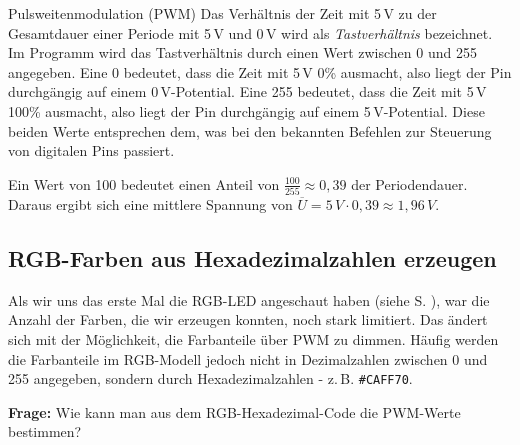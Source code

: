 \begin{zsfg}{Pulsweitenmodulation (PWM)}
	Das Verhältnis der Zeit mit 5\,V zu der Gesamtdauer einer Periode mit 5\,V und 0\,V wird als \emph{Tastverhältnis} bezeichnet. Im Programm wird das Tastverhältnis durch einen Wert zwischen 0 und 255 angegeben. Eine 0 bedeutet, dass die Zeit mit 5\,V 0\% ausmacht, also liegt der Pin durchgängig auf einem 0\,V-Potential. Eine 255 bedeutet, dass die Zeit mit 5\,V 100\% ausmacht, also liegt der Pin durchgängig auf einem 5\,V-Potential. Diese beiden Werte entsprechen dem, was bei den bekannten Befehlen zur Steuerung von digitalen Pins passiert.
	
	Ein Wert von 100 bedeutet einen Anteil von $\frac{100}{255}\approx 0,39$ der Periodendauer. Daraus ergibt sich eine mittlere Spannung von $\overline{U}=5\,V\cdot 0,39\approx 1,96\,V$.
\end{zsfg}

\newpage
\subsection{RGB-Farben aus Hexadezimalzahlen erzeugen}\label{proj:rgbled2}

Als wir uns das erste Mal die RGB-LED angeschaut haben (siehe S. \pageref{proj:rgbled1}), war die Anzahl der Farben, die wir erzeugen konnten, noch stark limitiert. Das ändert sich mit der Möglichkeit, die Farbanteile über PWM zu dimmen. Häufig werden die Farbanteile im RGB-Modell jedoch nicht in Dezimalzahlen zwischen 0 und 255 angegeben, sondern durch Hexadezimalzahlen - z.\,B. \texttt{\#CAFF70}.

\begin{ziel}
	\textbf{Frage:} Wie kann man aus dem RGB-Hexadezimal-Code die PWM-Werte bestimmen?
\end{ziel}

